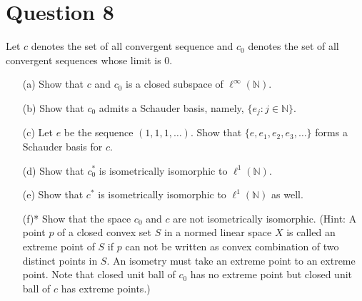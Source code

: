 \section{Question 8}
\horz
Let $c$ denotes the set of all convergent sequence and $c_0$ denotes the set of all convergent sequences whose limit is $0.$ 
\begin{itemize}
\item[(a)] Show that $c$ and $c_0$ is a closed subspace of $\ell^{\infty}(\mathbb N).$
\item[(b)]  Show that $c_0$ admits a Schauder basis, namely, $\{e_j: j\in\mathbb N\}.$
\item [(c)]  Let $e$ be the sequence $(1,1,1,\ldots).$ Show that $\{e,e_1,e_2,e_3,\ldots\}$ forms a Schauder basis for $c.$
\item[(d)] Show that $c_0^*$ is isometrically isomorphic to $\ell^1(\mathbb N).$
\item[(e)]  Show that $c^*$ is isometrically isomorphic to $\ell^1(\mathbb N)$ as well.
\item[(f)*] Show that the space $c_0$ and $c$ are not isometrically isomorphic. (Hint: A point $p$ of a closed convex set $S$ in a normed linear space $X$ is called an extreme point of $S$ if $p$ can not be written as convex combination of two distinct points in $S.$   An isometry must take an extreme point to an extreme point. Note that closed unit ball of $c_0$ has no extreme point but closed unit ball of $c$ has extreme points.)
\end{itemize}
\horz

